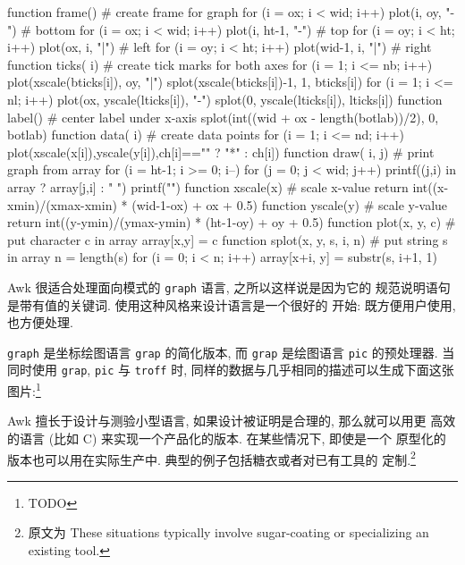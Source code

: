 \begin{awkcode}
    function frame() {        # create frame for graph
        for (i = ox; i < wid; i++) plot(i, oy, "-")     # bottom
        for (i = ox; i < wid; i++) plot(i, ht-1, "-")   # top
        for (i = oy; i < ht; i++) plot(ox, i, "|")      # left
        for (i = oy; i < ht; i++) plot(wid-1, i, "|")   # right
    }
    function ticks(    i) {   # create tick marks for both axes
        for (i = 1; i <= nb; i++) {
            plot(xscale(bticks[i]), oy, "|")
            splot(xscale(bticks[i])-1, 1, bticks[i])
        }
        for (i = 1; i <= nl; i++) {
            plot(ox, yscale(lticks[i]), "-")
            splot(0, yscale(lticks[i]), lticks[i])
        }
    }
    function label() {        # center label under x-axis
        splot(int((wid + ox - length(botlab))/2), 0, botlab)
    }
    function data(    i) {    # create data points
        for (i = 1; i <= nd; i++)
            plot(xscale(x[i]),yscale(y[i]),ch[i]=="" ? "*" : ch[i])
    }
    function draw(    i, j) { # print graph from array
        for (i = ht-1; i >= 0; i--) {
            for (j = 0; j < wid; j++)
                printf((j,i) in array ? array[j,i] : " ")
            printf("\n")
        }
    }
    function xscale(x) {      # scale x-value
        return int((x-xmin)/(xmax-xmin) * (wid-1-ox) + ox + 0.5)
    }
    function yscale(y) {      # scale y-value
        return int((y-ymin)/(ymax-ymin) * (ht-1-oy) + oy + 0.5)
    }
    function plot(x, y, c) {  # put character c in array
        array[x,y] = c
    }
    function splot(x, y, s,    i, n) { # put string s in array
        n = length(s)
        for (i = 0; i < n; i++)
            array[x+i, y] = substr(s, i+1, 1)
    }
\end{awkcode}

Awk 很适合处理面向模式的 \texttt{graph} 语言, 之所以这样说是因为它的
规范说明语句是带有值的关键词. 使用这种风格来设计语言是一个很好的
开始: 既方便用户使用, 也方便处理.

\texttt{graph} 是坐标绘图语言 \texttt{grap} 的简化版本, 而 \texttt{grap}
是绘图语言 \texttt{pic} 的预处理器. 
 当同时使用 \texttt{grap}, \texttt{pic} 与 \texttt{troff}
时, 同样的数据与几乎相同的描述可以生成下面这张图片:\footnote{TODO}

Awk 擅长于设计与测验小型语言, 如果设计被证明是合理的, 那么就可以用更
高效的语言 (比如 C) 来实现一个产品化的版本. 在某些情况下, 即使是一个
原型化的版本也可以用在实际生产中. 典型的例子包括糖衣或者对已有工具的
定制.\footnote{原文为 These situations typically involve sugar-coating or
specializing an existing tool.}

